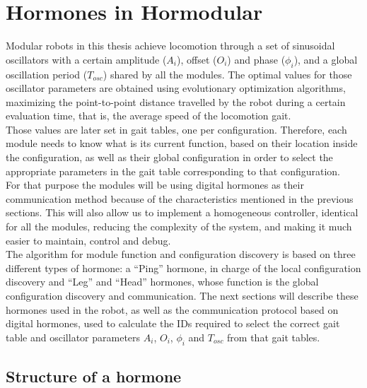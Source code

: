 \section{Hormones in Hormodular}
\label{hormone_hormodular}

Modular robots in this thesis achieve locomotion through a set of sinusoidal oscillators with a certain amplitude ($A_i$), offset ($O_i$) and phase ($\phi_i$), and a global oscillation period ($T_{osc}$) shared by all the modules. The optimal values for those oscillator parameters are obtained using evolutionary optimization algorithms, maximizing the point-to-point distance travelled by the robot during a certain evaluation time, that is, the average speed of the locomotion gait.\\

Those values are later set in gait tables, one per configuration. Therefore, each module needs to know what is its current function, based on their location inside the configuration,  as well as their global configuration in order to select the appropriate parameters in the gait table corresponding to that configuration.\\

For that purpose the modules will be using digital hormones as their communication method because of the characteristics mentioned in the previous sections. This will also allow us to implement a homogeneous controller, identical for all the modules, reducing the complexity of the system, and making it much easier to maintain, control and debug.\\ 

The algorithm for module function and configuration discovery is based on three different types of hormone: a ``Ping'' hormone, in charge of the local configuration discovery and ``Leg'' and ``Head'' hormones, whose function is the global configuration discovery and communication. The next sections will describe these hormones used in the robot, as well as the communication protocol based on digital hormones, used to calculate the IDs required to select the correct gait table and oscillator parameters $A_i$, $O_i$, $\phi_i$ and $T_{osc}$ from that gait tables.

\subsection{Structure of a hormone}
\label{hormone_structure}

